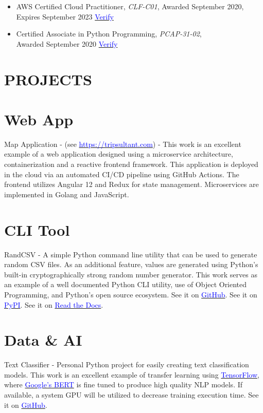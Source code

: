 \documentclass[margin]{res}
\begin{document}
\begin{resume}
\begin{itemize}
		\item AWS Certified Cloud Practitioner, \textit{CLF-C01}, Awarded September 2020, Expires September 2023
		      \href{https://www.youracclaim.com/badges/48063b2f-6f7f-4b6c-a040-5c42393c4bc0}{\textcolor{blue}{Verify}}


		\item Certified Associate in Python Programming, \textit{PCAP-31-02}, \\
		      Awarded September 2020 \href{https://www.youracclaim.com/badges/bfd6aae6-1ab4-461b-8a62-f25cfb0bd29d}{\textcolor{blue}{Verify}}

	\end{itemize}

	\section{\textcolor{NavyBlue}{PROJECTS}}
	\normalsize{\section{Web App}}
	Map Application - (see \href{https://tripsultant.com}{\textcolor{blue}{\url{https://tripsultant.com}}}) - This work is an excellent example of a web application
	designed using a microservice architecture, containerization and a reactive frontend framework. This application is deployed in the
	cloud via an automated CI/CD pipeline using GitHub Actions. The frontend utilizes Angular 12 and Redux for state management. Microservices
	are implemented in Golang and JavaScript.
	\normalsize{\section{CLI Tool}}
	RandCSV - A simple Python command line utility that can be used to generate random CSV files.
	As an additional feature, values are generated using Python's built-in cryptographically strong random number generator. 
	This work serves as an example of a well documented Python CLI utility, 
	use of Object Oriented Programming, and Python's open source ecosystem. See it on \href{https://github.com/scriptloom/randcsv}
	{\textcolor{black}{\textcolor{blue}{GitHub}}}. See it on \href{https://pypi.org/project/randcsv/}
	{\textcolor{black}{\textcolor{blue}{PyPI}}}. See it on \href{https://randcsv.readthedocs.io/en/latest/}
	{\textcolor{black}{\textcolor{blue}{Read the Docs}}}.
	\normalsize{\section{Data \& AI}}
	Text Classifier - Personal Python project for easily creating text classification models. This work is an excellent example of transfer learning using \href{https://www.tensorflow.org/}{\textcolor{blue}{TensorFlow}}, where \href{https://arxiv.org/abs/1810.04805}{\textcolor{blue}{Google's BERT}} is fine tuned to produce high quality NLP models. If available, a system GPU will be utilized to decrease training execution time. See it on \href{https://github.com/jameone/woodgate}
	{\textcolor{black}{\textcolor{blue}{GitHub}}}.


\end{resume}
\end{document}
